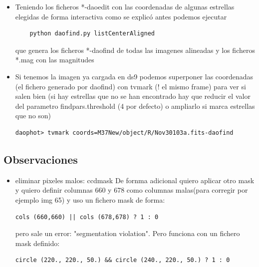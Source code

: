 \documentclass{article}
\begin{document}
\begin{itemize}

\item Teniendo los ficheros *-daoedit con las coordenadas de algunas estrellas elegidas de forma interactiva como 
se explicó antes podemos ejecutar 

\begin{verbatim}
	python daofind.py listCenterAligned
\end{verbatim}
que genera los ficheros *-daofind de todas las imagenes alineadas y los ficheros *.mag con las magnitudes




\item Si tenemos la imagen ya cargada en ds9 podemos superponer las coordenadas (el fichero generado por daofind)
 con tvmark (! el mismo frame) para ver si salen bien
(si hay estrellas que no se han encontrado hay que reducir el valor del parametro  findpars.threshold (4 por defecto) o ampliarlo si marca estrellas que no son)

\begin{verbatim}
daophot> tvmark coords=M37New/object/R/Nov30103a.fits-daofind 
\end{verbatim}

\end{itemize}



\subsection*{Observaciones}
\begin{itemize}
\item eliminar pixeles malos: ccdmask
De fornma adicional quiero aplicar otro mask y quiero definir columnas 660 y 678 como columnas malas(para corregir por ejemplo img 65) y uso un fichero mask de forma:
\begin{verbatim}
cols (660,660) || cols (678,678) ? 1 : 0
\end{verbatim}
pero sale un error: "segmentation violation". Pero funciona con un fichero mask definido:
\begin{verbatim}
circle (220., 220., 50.) && circle (240., 220., 50.) ? 1 : 0
\end{verbatim}





\end{itemize}
\end{document}
